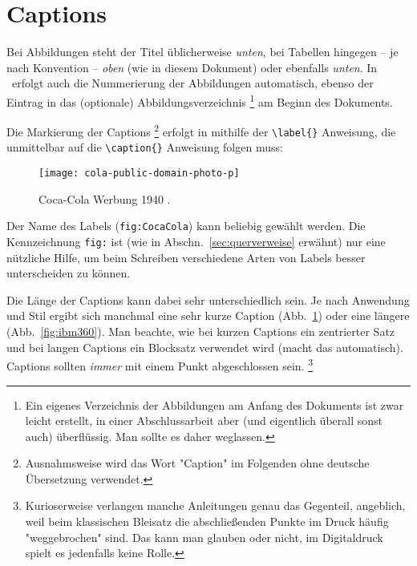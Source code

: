 \section{Captions}

Bei Abbildungen steht der Titel üblicherweise \emph{unten}, bei
Tabellen hingegen -- je nach Konvention -- \emph{oben} (wie in diesem Dokument) 
oder ebenfalls \emph{unten}. In \latex\ erfolgt
auch die Nummerierung der Abbildungen automatisch, ebenso der
Eintrag in das (optionale)
Abbildungsverzeichnis%
\footnote{Ein eigenes Verzeichnis der Abbildungen am Anfang des Dokuments
ist zwar leicht erstellt, in einer Abschlussarbeit aber (und eigentlich
überall sonst auch) überflüssig. Man sollte es daher weglassen.}
am Beginn des Dokuments.

Die Markierung der Captions%
\footnote{Ausnahmsweise wird das Wort "Caption" im Folgenden
ohne deutsche Übersetzung verwendet.} erfolgt in \latex mithilfe
der \verb!\label{}! Anweisung, die unmittelbar auf die
\verb!\caption{}! Anweisung folgen muss:
%
\begin{LaTeXCode}[numbers=none]
\begin{figure}
\centering
\texttt{[image: cola-public-domain-photo-p]}
\caption{Coca-Cola Werbung 1940 \cite{CocaCola1940}.}
\label{fig:CocaCola}
\end{figure}
\end{LaTeXCode}
%
Der Name des Labels (\texttt{fig:CocaCola}) kann beliebig gewählt werden. 
Die Kennzeichnung \texttt{fig:} ist (wie in Abschn.\ \ref{sec:querverweise} 
erwähnt) nur eine nützliche Hilfe, um beim Schreiben verschiedene Arten 
von Labels besser unterscheiden zu können.

Die Länge der Captions kann dabei sehr unterschiedlich sein. Je
nach Anwendung und Stil ergibt sich manchmal eine sehr kurze
Caption (Abb.~\ref{fig:CocaCola}) oder eine längere
(Abb.~\ref{fig:ibm360}).
Man beachte, wie bei kurzen Captions ein
zentrierter Satz und bei langen Captions ein Blocksatz verwendet
wird (\latex macht das automatisch).
Captions sollten \emph{immer} mit einem Punkt abgeschlossen sein.%
\footnote{Kurioserweise verlangen manche Anleitungen
genau das Gegenteil, angeblich, weil beim klassischen Bleisatz 
die abschließenden Punkte im Druck häufig "weggebrochen" sind. 
Das kann man glauben oder nicht, im Digitaldruck 
spielt es jedenfalls keine Rolle.}

